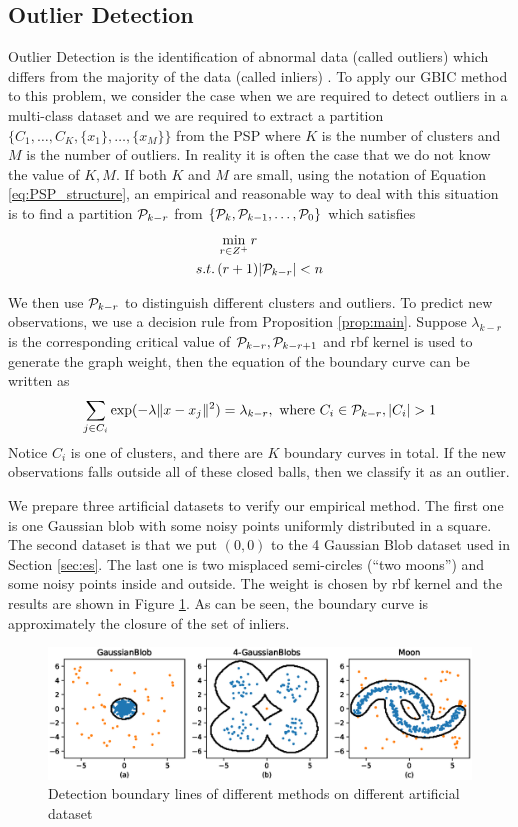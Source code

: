 \subsection{Outlier Detection}\label{subsec:od}
Outlier Detection is the identification of abnormal data (called outliers) which differs from the majority of the data (called inliers) \citep{grubbs1969procedures}.
To apply our GBIC method to this problem, we consider the case when we are required to detect outliers in a multi-class dataset and we are required to
extract a partition $\{C_1, \dots, C_K, \{x_1\}, \dots, \{x_M\}\}$ from the PSP where $K$ is the number of clusters and $M$ is the number of outliers.
In reality it is often the case that we do not know the value of $K, M$.
If both $K$ and $M$ are small, using the notation of Equation \eqref{eq:PSP_structure}, an empirical and reasonable way to deal with this situation is to find a partition
$\P_{k-r}$ from  $\{\P_k, \P_{k-1}, \dots, \P_0\}$ which satisfies
\begin{align*}
& \min_{r\in Z^+} r \\
s.t.\, & (r+1)\abs{\P_{k-r}} < n
\end{align*}

We then use $\P_{k-r}$ to distinguish different clusters and outliers. To predict new observations,  we use a decision rule from Proposition \ref{prop:main}.
Suppose $\lambda_{k-r}$ is the corresponding critical value of $\P_{k-r}, \P_{k-r+1}$ and rbf kernel is used to generate the graph weight, then the equation of
the boundary curve can be written as
\begin{equation}
\sum_{j \in C_i} \exp(-\lambda \norm{x - x_j}^2)= \lambda_{k-r}, \text{ where } C_i \in \P_{k-r},  \abs{C_i} > 1
\end{equation}
Notice $C_i$ is one of clusters, and there are $K$ boundary curves in total. If the new observations falls outside all of these closed balls, then we classify it as an outlier.

We prepare three artificial datasets to verify our empirical method. The first one is one Gaussian blob with some noisy points uniformly distributed in a square. The second dataset is that we put $(0,0)$ to the 4 Gaussian Blob dataset used in Section \ref{sec:es}. The last one is two misplaced semi-circles (``two moons'') and some noisy points inside and outside. The weight is chosen by rbf kernel and the results are shown in Figure \ref{fig:boundary}. As can be seen, the boundary curve is approximately the closure of the set of inliers.
\begin{figure}[!ht]
	\centering
	\includegraphics[width=\textwidth]{pic/outlier_boundary_illustration.eps}
	\caption{Detection boundary lines of different methods on different artificial dataset}	\label{fig:boundary}
\end{figure}

